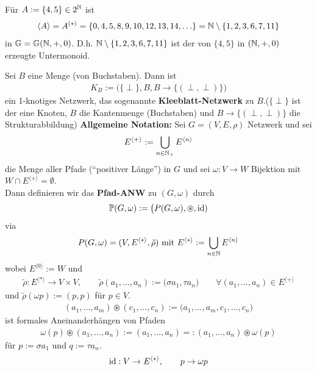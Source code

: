 \begin{beispiel}
    Für $A:=\lbrace 4,5\rbrace\in 2^{\mathbb{N}}$ ist 
    \begin{align*}
        \langle A\rangle=A^{(\ast)}=\lbrace0,4,5,8,9,10,12,13,14,\ldots\rbrace=\mathbb{N}\setminus\lbrace1,2,3,6,7,11\rbrace
    \end{align*}
    in $\mathbb{G}=\mathbb{G}(\mathbb{N},+,0)$. D.h. $\mathbb{N}\setminus\lbrace1,2,3,6,7,11\rbrace$ ist der von $\lbrace4,5\rbrace$ in $(\mathbb{N},+,0)$ erzeugte Untermonoid.
\end{beispiel}

Sei $B$ eine Menge (von Buchstaben). Dann ist 
\begin{align*}
    K_B:=\big(\lbrace\perp\rbrace,B,B\to\lbrace(\perp,\perp)\rbrace\Big)
\end{align*}
ein 1-knotiges Netzwerk, das sogenannte \textbf{Kleeblatt-Netzwerk} zu $B$.($\lbrace\perp\rbrace$ ist der eine Knoten, $B$ die Kantenmenge (Buchstaben) und $B\to\lbrace(\perp,\perp)\rbrace$ die Strukturabbildung)\nl
\textbf{Allgemeine Notation:} Sei $G=(V,E,\rho)$ Netzwerk und sei
\begin{align*}
    E^{\langle+\rangle}:=\bigcup\limits_{n\in\mathbb{N}_+} E^{\langle n\rangle}
\end{align*}
die Menge aller Pfade (``positiver Länge'') in $G$ und sei $\omega:V\to W$ Bijektion mit $W\cap E^{\langle +\rangle}=\emptyset$.\\
Dann definieren wir das \textbf{Pfad-ANW} zu $(G,\omega)$ durch
\begin{align*}
    \mathbb{P}(G,\omega):=\big(P(G,\omega),\circledast,\operatorname{id})
\end{align*}
via
\begin{align*}
    P(G,\omega)=(V,E^{\langle\ast\rangle},\tilde{\rho})\text{ mit } E^{\langle\ast\rangle}:=\bigcup\limits_{n\in\mathbb{N}} E^{\langle n\rangle}
\end{align*}
wobei $E^{\langle0\rangle}:=W$ und
\begin{align*}
    \tilde{\rho}:E^{\langle\ast\rangle}\to V\times V,\qquad\tilde{\rho}(a_1,\ldots,a_n):=\big(\sigma a_1,\tau a_n\big)
    \qquad\forall(a_1,\ldots,a_n)\in E^{\langle+\rangle}
\end{align*}
und $\tilde{\rho}(\omega p):=(p,p)$ für $p\in V$.
\begin{align*}
    (a_1,\ldots,a_m)\circledast(c_1,\ldots,c_n)
    :=\big(a_1,\ldots,a_m,c_1,\ldots, c_n\big)
\end{align*}
ist formales Aneinanderhängen von Pfaden 
\begin{align*}
    \omega(p)\circledast(a_1,\ldots,a_n):=(a_1,\ldots,a_n)=:(a_1,\ldots,a_n)\circledast\omega(p)
\end{align*}
für $p:=\sigma a_1$ und $q:=\tau a_n$.
\begin{align*}
    \operatorname{id}:V\to E^{\langle\ast\rangle},\qquad p\to\omega p
\end{align*}

